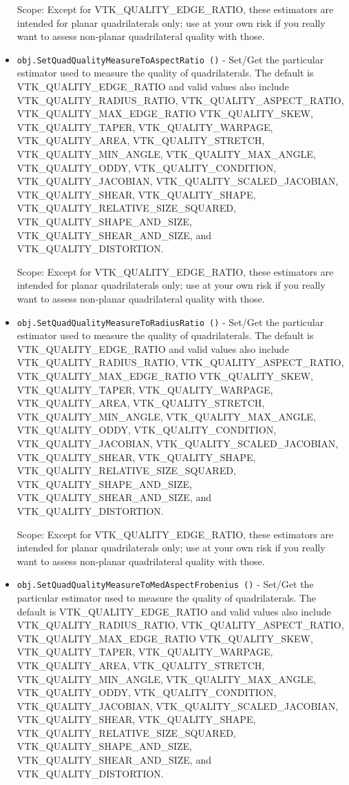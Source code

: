 \begin{itemize}
 Scope: Except for VTK\_QUALITY\_EDGE\_RATIO, these estimators are intended for planar
 quadrilaterals only; use at your own risk if you really want to assess non-planar
 quadrilateral quality with those.

\item  \verb|obj.SetQuadQualityMeasureToAspectRatio ()| -  Set/Get the particular estimator used to measure the quality of quadrilaterals.
 The default is VTK\_QUALITY\_EDGE\_RATIO and valid values also include
 VTK\_QUALITY\_RADIUS\_RATIO, VTK\_QUALITY\_ASPECT\_RATIO, VTK\_QUALITY\_MAX\_EDGE\_RATIO
 VTK\_QUALITY\_SKEW, VTK\_QUALITY\_TAPER, VTK\_QUALITY\_WARPAGE, VTK\_QUALITY\_AREA,
 VTK\_QUALITY\_STRETCH, VTK\_QUALITY\_MIN\_ANGLE, VTK\_QUALITY\_MAX\_ANGLE,
 VTK\_QUALITY\_ODDY, VTK\_QUALITY\_CONDITION, VTK\_QUALITY\_JACOBIAN,
 VTK\_QUALITY\_SCALED\_JACOBIAN, VTK\_QUALITY\_SHEAR, VTK\_QUALITY\_SHAPE,
 VTK\_QUALITY\_RELATIVE\_SIZE\_SQUARED, VTK\_QUALITY\_SHAPE\_AND\_SIZE,
 VTK\_QUALITY\_SHEAR\_AND\_SIZE, and VTK\_QUALITY\_DISTORTION.

 Scope: Except for VTK\_QUALITY\_EDGE\_RATIO, these estimators are intended for planar
 quadrilaterals only; use at your own risk if you really want to assess non-planar
 quadrilateral quality with those.

\item  \verb|obj.SetQuadQualityMeasureToRadiusRatio ()| -  Set/Get the particular estimator used to measure the quality of quadrilaterals.
 The default is VTK\_QUALITY\_EDGE\_RATIO and valid values also include
 VTK\_QUALITY\_RADIUS\_RATIO, VTK\_QUALITY\_ASPECT\_RATIO, VTK\_QUALITY\_MAX\_EDGE\_RATIO
 VTK\_QUALITY\_SKEW, VTK\_QUALITY\_TAPER, VTK\_QUALITY\_WARPAGE, VTK\_QUALITY\_AREA,
 VTK\_QUALITY\_STRETCH, VTK\_QUALITY\_MIN\_ANGLE, VTK\_QUALITY\_MAX\_ANGLE,
 VTK\_QUALITY\_ODDY, VTK\_QUALITY\_CONDITION, VTK\_QUALITY\_JACOBIAN,
 VTK\_QUALITY\_SCALED\_JACOBIAN, VTK\_QUALITY\_SHEAR, VTK\_QUALITY\_SHAPE,
 VTK\_QUALITY\_RELATIVE\_SIZE\_SQUARED, VTK\_QUALITY\_SHAPE\_AND\_SIZE,
 VTK\_QUALITY\_SHEAR\_AND\_SIZE, and VTK\_QUALITY\_DISTORTION.

 Scope: Except for VTK\_QUALITY\_EDGE\_RATIO, these estimators are intended for planar
 quadrilaterals only; use at your own risk if you really want to assess non-planar
 quadrilateral quality with those.

\item  \verb|obj.SetQuadQualityMeasureToMedAspectFrobenius ()| -  Set/Get the particular estimator used to measure the quality of quadrilaterals.
 The default is VTK\_QUALITY\_EDGE\_RATIO and valid values also include
 VTK\_QUALITY\_RADIUS\_RATIO, VTK\_QUALITY\_ASPECT\_RATIO, VTK\_QUALITY\_MAX\_EDGE\_RATIO
 VTK\_QUALITY\_SKEW, VTK\_QUALITY\_TAPER, VTK\_QUALITY\_WARPAGE, VTK\_QUALITY\_AREA,
 VTK\_QUALITY\_STRETCH, VTK\_QUALITY\_MIN\_ANGLE, VTK\_QUALITY\_MAX\_ANGLE,
 VTK\_QUALITY\_ODDY, VTK\_QUALITY\_CONDITION, VTK\_QUALITY\_JACOBIAN,
 VTK\_QUALITY\_SCALED\_JACOBIAN, VTK\_QUALITY\_SHEAR, VTK\_QUALITY\_SHAPE,
 VTK\_QUALITY\_RELATIVE\_SIZE\_SQUARED, VTK\_QUALITY\_SHAPE\_AND\_SIZE,
 VTK\_QUALITY\_SHEAR\_AND\_SIZE, and VTK\_QUALITY\_DISTORTION.


\end{itemize}
